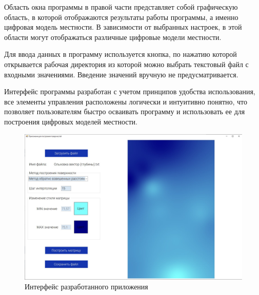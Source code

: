 Область окна программы в правой части представляет собой графическую область, в которой отображаются результаты работы программы, а именно цифровая модель местности. В зависимости от выбранных настроек, в этой области могут отображаться различные цифровые модели местности.

Для ввода данных в программу используется кнопка, по нажатию которой открывается рабочая директория из которой можно выбрать текстовый файл с входными значениями. Введение значений вручную не предусматривается.

Интерфейс программы разработан с учетом принципов удобства использования, все элементы управления расположены логически и интуитивно понятно, что позволяет пользователям быстро осваивать программу и использовать ее для построения цифровых моделей местности.

\begin{figure}[h!]
    \center
    \includegraphics[scale=0.4]{images/Interface.jpg}
    \caption{Интерфейс разработанного приложения}
    \label{fig:14}
\end{figure}

